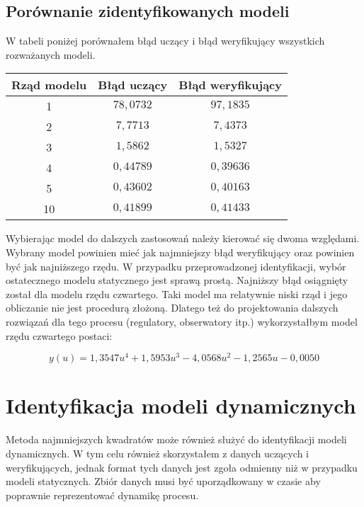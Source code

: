 \documentclass[a4paper,titlepage,11pt,floatssmall]{mwrep}
\begin{document}
\newpage

\subsection{Porównanie zidentyfikowanych modeli}

W tabeli poniżej porównałem błąd uczący i błąd weryfikujący wszystkich rozważanych modeli.
\bigskip
\begin{center}


\begin{tabular}{|c|c|c|}
  \hline 
  Rząd modelu & Błąd uczący & Błąd weryfikujący \\
  \hline
  1 & $78,0732$ & $97,1835$ \\
  \hline
  2 & $7,7713$ & $7,4373$ \\
  \hline
  3 & $1,5862$ & $1,5327$ \\
  \hline
  4 & $0,44789$ & $0,39636$ \\
  \hline
  5 & $0,43602$ & $0,40163$ \\
  \hline
  10 & $0,41899$ & $0,41433$ \\
  \hline
\end{tabular} 
\end{center}

\bigskip
Wybierając model do dalszych zastosowań należy kierować się dwoma względami. Wybrany model powinien mieć jak najmniejszy błąd weryfikujący oraz powinien być jak najniższego rzędu. W przypadku przeprowadzonej identyfikacji, wybór ostatecznego modelu statycznego jest sprawą prostą. Najniższy błąd osiągnięty został dla modelu rzędu czwartego. Taki model ma relatywnie niski rząd i jego obliczanie nie jest procedurą złożoną. Dlatego też do projektowania dalszych rozwiązań dla tego procesu (regulatory, obserwatory itp.) wykorzystałbym model rzędu czwartego postaci: 

\begin{equation*}
y(u) = 1,3547u^4 + 1,5953u^3 - 4,0568u^2 - 1,2565u - 0, 0050
\end{equation*}

\newpage
\section{Identyfikacja modeli dynamicznych}
Metoda najmniejszych kwadratów może również służyć do identyfikacji modeli dynamicznych. W tym celu również skorzystałem z danych uczących i weryfikujących, jednak format tych danych jest zgoła odmienny niż w przypadku modeli statycznych. Zbiór danych musi być uporządkowany w czasie aby poprawnie reprezentować dynamikę procesu.
\end{document}
